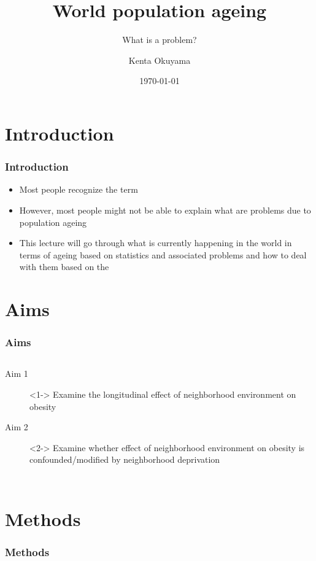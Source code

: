 \documentclass{beamer}
\title{World population ageing}
\subtitle{What is a problem?}
\author{Kenta Okuyama\inst{1}}
\institute{\inst{1}Center for Primary Health Care Research \\
Lund University}
\date{\today}
\begin{document}
\begin{frame}
\titlepage
\end{frame}

\section{Introduction} %
\begin{frame} %
\frametitle{Introduction}
\begin{itemize}
	\item Most people recognize the term  
	\item However, most people might not be able to explain what are problems due to population ageing
	\item This lecture will go through what is currently happening in the world in terms of ageing based on statistics and associated problems and how to deal with them based on the 
\end{itemize}
\end{frame}

\section{Aims}
\begin{frame} %
\frametitle{Aims}
\begin{columns}
	\begin{description}
		\item[Aim 1]<1-> Examine the longitudinal effect of neighborhood environment on obesity
		\item[Aim 2]<2-> Examine whether effect of neighborhood environment on obesity is confounded/modified by neighborhood deprivation 
	\end{description}
\end{columns}
\end{frame}

\section{Methods}
\begin{frame}
\frametitle{Methods}
\end{frame}
\end{document}
